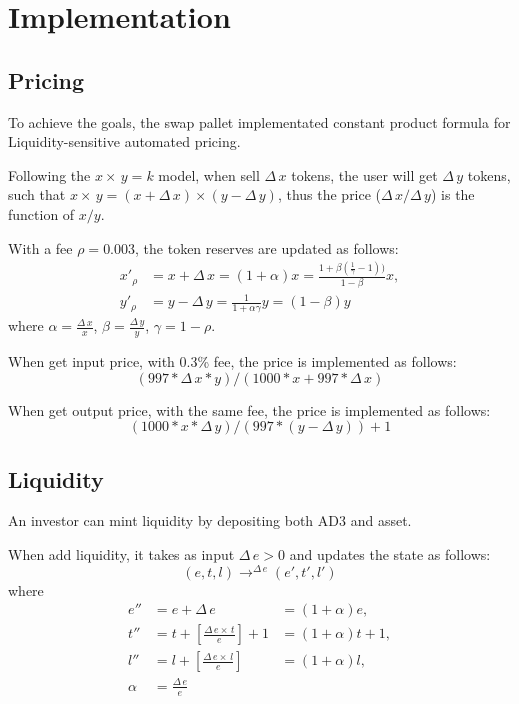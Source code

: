 \documentclass[twoside,twocolumn]{article}
\begin{document}
\section{Implementation}

\subsection{Pricing}

To achieve the goals, the swap pallet
implementated constant product formula\cite{ref3}
for Liquidity-sensitive automated pricing.

Following the $x\times\,y=k$ model,
when sell $\Delta\,x$ tokens,
the user will get $\Delta\,y$ tokens,
such that $x\times\,y=(x+\Delta\,x)\times(y-\Delta\,y)$,
thus the price ($\Delta\,x/\Delta\,y$) is the function of $x/y$.

With a fee $\rho=0.003$, the token reserves are updated as follows:
\begin{align*}
    {x}'_{\rho} & =x+\Delta\,x=(1+\alpha)x=\frac{1+\beta(\frac{1}{\gamma}-1))}{1-\beta}x, \\
    {y}'_{\rho} & =y-\Delta\,y=\frac{1}{1+\alpha\gamma}y=(1-\beta)y
\end{align*}
where $\alpha=\frac{\Delta\,x}{x}$, $\beta=\frac{\Delta\,y}{y}$, $\gamma=1-\rho$.

When get input price, with 0.3\% fee,
the price is implemented as follows:
\[
    (997*\Delta\,x*y)/(1000*x+997*\Delta\,x)
\]

When get output price, with the same fee,
the price is implemented as follows:
\[
    (1000*x*\Delta\,y)/(997*(y-\Delta\,y))+1
\]

\subsection{Liquidity}

An investor can mint liquidity by depositing both AD3 and asset.

When add liquidity,
it takes as input $\Delta\,e>0$ and updates the state as follows:
\[
    (e,t,l)\mathop{\to}^{\Delta\,e}({e}',{t}',{l}')
\]
where
\begin{align*}
    {e}''  & = e+\Delta\,e                                    & =(1+\alpha)e,   \\
    {t}''  & = t+\left[\frac{\Delta\,e\times\,t}{e}\right] +1 & =(1+\alpha)t+1, \\
    {l}''  & = l+\left[\frac{\Delta\,e\times\,l}{e}\right]    & =(1+\alpha)l,   \\
    \alpha & = \frac{\Delta\,e}{e}
\end{align*}
\end{document}

